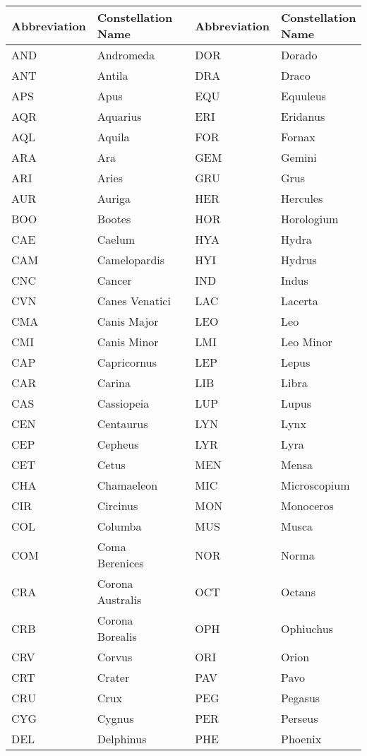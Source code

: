 \begin{table}

\begin{tabular}{|l|l|l|l|l|}\hline
Abbreviation  &  Constellation Name & &  Abbreviation  &  Constellation Name \\ \hline
AND  &  Andromeda      & &  DOR  &  Dorado  \\
ANT  &  Antila         & &  DRA  &  Draco  \\
APS  &  Apus           & &  EQU  &  Equuleus  \\
AQR  &  Aquarius       & &  ERI  &  Eridanus  \\
AQL  &  Aquila         & &  FOR  &  Fornax  \\
ARA  &  Ara            & &  GEM  &  Gemini  \\
ARI  &  Aries          & &  GRU  &  Grus  \\
AUR  &  Auriga         & &  HER  &  Hercules  \\
BOO  &  Bootes         & &  HOR  &  Horologium  \\
CAE  &  Caelum         & &  HYA  &  Hydra  \\
CAM  &  Camelopardis   & &  HYI  &  Hydrus  \\
CNC  &  Cancer         & &  IND  &  Indus  \\
CVN  &  Canes Venatici & &  LAC  &  Lacerta  \\
CMA  &  Canis Major    & &  LEO  &  Leo  \\
CMI  &  Canis Minor    & &  LMI  &  Leo Minor  \\
CAP  &  Capricornus    & &  LEP  &  Lepus  \\
CAR  &  Carina         & &  LIB  &  Libra  \\
CAS  &  Cassiopeia     & &  LUP  &  Lupus  \\
CEN  &  Centaurus      & &  LYN  &  Lynx  \\
CEP  &  Cepheus        & &  LYR  &  Lyra  \\
CET  &  Cetus          & &  MEN  &  Mensa  \\
CHA  &  Chamaeleon     & &  MIC  &  Microscopium  \\
CIR  &  Circinus       & &  MON  &  Monoceros  \\
COL  &  Columba        & &  MUS  &  Musca  \\
COM  &  Coma Berenices & &  NOR  &  Norma  \\
CRA  &  Corona Australis & &  OCT  &  Octans  \\
CRB  &  Corona Borealis  & &  OPH  &  Ophiuchus  \\
CRV  &  Corvus         & & ORI  &  Orion  \\
CRT  &  Crater         & &  PAV  &  Pavo  \\
CRU  &  Crux           & &  PEG  &  Pegasus  \\
CYG  &  Cygnus         & &  PER  &  Perseus  \\
DEL  &  Delphinus      & &  PHE  &  Phoenix  \\ \hline
\end{tabular}


\end{table}
